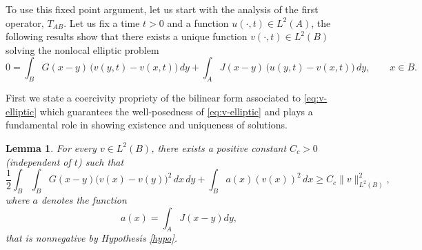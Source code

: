 \documentclass[reqno]{amsart}
\numberwithin{equation}{section}
\newtheorem{lemma}[theorem]{Lemma}
\begin{document}
To use this fixed point argument, let us start with the analysis of the first operator, $T_{AB}$. 
Let us fix a time $t>0$ and a function $u(\cdot,t)\in L^{2}(A)$, the following results show that
there exists a unique function $v(\cdot,t)\in L^{2}(B)$ solving the nonlocal elliptic problem
\begin{equation}\label{eq:v-elliptic}
    0=\int_{B} G(x-y)\,\bigl(v(y,t)-v(x,t)\bigr)\,dy
      +\int_{A} J(x-y)\,\bigl(u(y,t)-v(x,t)\bigr)\,dy,
      \qquad x\in B.
\end{equation}

First we state a coercivity propriety of the bilinear form associated to \eqref{eq:v-elliptic}
which guarantees the well-posedness of \eqref{eq:v-elliptic} and plays a fundamental role in
showing existence and uniqueness of solutions.

\begin{lemma}\label{FCoerp-e}\label{lemma:coerc_v}
For every $v \in L^2(B)$, there exists a positive constant $C_c>0$ (independent of $t$) such that
\[
\frac{1}{2}\int_{B}\int_{B} G(x-y)\bigl(v(x)-v(y)\bigr)^2 \,dx\,dy
+ \int_B a(x) (v(x))^2 \,dx \ge C_c \|v\|_{L^2(B)}^2,
\]
where $a$ denotes the function
$$a(x)=\int_A J(x-y)dy,$$
that is nonnegative by Hypothesis \ref{hypo}.
\end{lemma}
\end{document}
